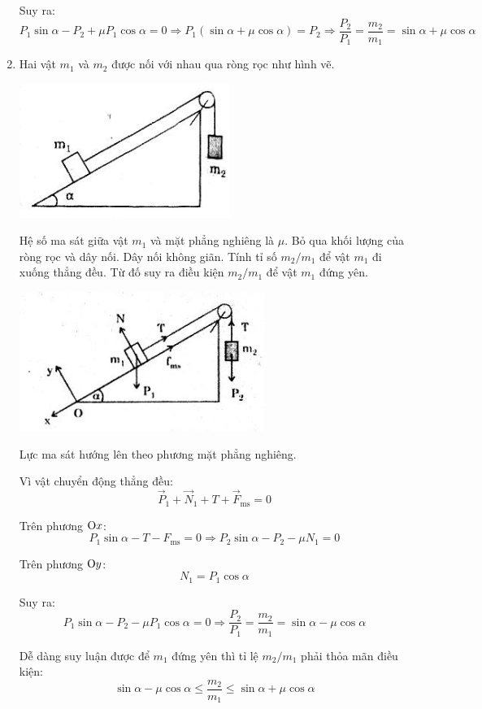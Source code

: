 \begin{enumerate}[label=\bfseries Câu \arabic*:]
{		Suy ra:
		$$P_1 \sin \alpha - P_2 + \mu P_1 \cos \alpha = 0 \Rightarrow P_1 (\sin \alpha + \mu \cos \alpha) = P_2 \Rightarrow \dfrac{P_2}{P_1} = \dfrac{m_2}{m_1} = \sin \alpha + \mu \cos \alpha$$
	}
	\item {}

\cauhoi
{Hai vật $m_1$ và $m_2$ được nối với nhau qua ròng rọc như hình vẽ.
	\begin{center}
		\includegraphics[scale=1]{../figs/VN10-2021-PH-TP024-1.png}
	\end{center}
	Hệ số ma sát giữa vật $m_1$ và mặt phẳng nghiêng là $\mu$. Bỏ qua khối lượng của ròng rọc và dây nối. Dây nối không giãn. Tính tỉ số $m_2 / m_1$ để vật $m_1$ đi xuống thẳng đều. Từ đố suy ra điều kiện $m_2 / m_1$ để vật $m_1$ đứng yên.
}

\loigiai
{		\begin{center}
		\includegraphics[scale=1.2]{../figs/VN10-2021-PH-TP024-3.png}
	\end{center}
	
	Lực ma sát hướng lên theo phương mặt phẳng nghiêng.
	
	Vì vật chuyển động thẳng đều:
	$$\vec P_1 + \vec N_1 + T + \vec F_\text{ms} = 0$$
	
	Trên phương $\text Ox$:
	$$P_1 \sin \alpha - T - F_\text{ms} = 0 \Rightarrow P_2 \sin \alpha - P_2 - \mu N_1 = 0$$
	
	Trên phương $\text Oy$:
	$$N_1 = P_1 \cos \alpha$$
	
	Suy ra:
	$$P_1 \sin \alpha - P_2 - \mu P_1 \cos \alpha = 0 \Rightarrow \dfrac{P_2}{P_1} = \dfrac{m_2}{m_1} = \sin \alpha - \mu \cos \alpha$$
	
	Dễ dàng suy luận được để $m_1$ đứng yên thì tỉ lệ $m_2 / m_1$ phải thỏa mãn điều kiện:
	$$\sin \alpha - \mu \cos \alpha \leq \dfrac{m_2}{m_1} \leq \sin \alpha + \mu \cos \alpha$$
}
\end{enumerate}